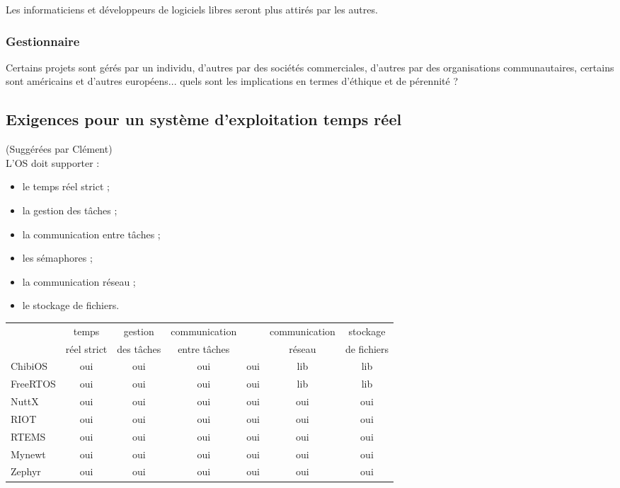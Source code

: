 Les informaticiens et développeurs de logiciels libres seront plus attirés par les
autres.\\

\subsubsection{Gestionnaire}
Certains projets sont gérés par un individu, d'autres par des sociétés commerciales,
d'autres par des organisations communautaires, certains sont américains et d'autres
européens... quels sont les implications en termes d'éthique et de pérennité ?

\subsection{Exigences pour un système d'exploitation temps réel}
(Suggérées par Clément)\\
L'OS doit supporter :
\begin{itemize}
	\item le temps réel strict ;
	\item la gestion des tâches ;
	\item la communication entre tâches ;
	\item les sémaphores ;
	\item la communication réseau ;
	\item le stockage de fichiers.\\
\end{itemize}

{\footnotesize
\begin{tabular}{lcccccc}
\toprule

		 & temps 	   & gestion	& communication & \MR{2}{sémaphores} & communication & stockage		\\
		 & réel strict & des tâches & entre tâches  &					 & réseau		 & de fichiers	\\
\midrule
ChibiOS	 &		oui	   &	oui		&		oui	 	&		oui			 &		lib		 &		lib		\\
FreeRTOS &		oui	   &	oui		&		oui	 	&		oui	 		 &		lib		 &		lib		\\
NuttX	 &		oui	   &	oui		&		oui	 	&		oui			 &		oui		 &		oui		\\
RIOT	 &		oui	   &	oui		&		oui	 	&		oui			 &		oui		 &		oui		\\
RTEMS	 &		oui	   &	oui		&		oui	 	&		oui			 &		oui		 &		oui		\\
Mynewt	 &		oui	   &	oui		&		oui	 	&		oui			 &		oui		 &		oui		\\
Zephyr	 &		oui	   &	oui		&		oui	 	&		oui			 &		oui		 &		oui		\\
\bottomrule
\end{tabular}
}
\\\\

